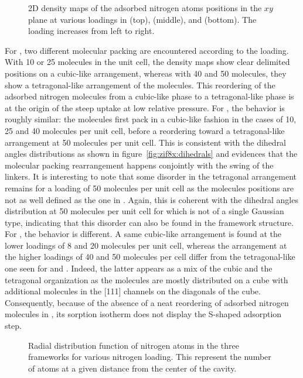 \documentclass[thesis]{subfiles}
\begin{document}
\begin{figure}[ht]
    \centering
    
    \caption{2D density maps of the adsorbed nitrogen atoms positions in the $xy$
    plane at various loadings in  (top), \ZIFCl (middle), and \ZIFBr
    (bottom). The loading increases from left to right.}
    \label{fig:zif8x:density}
\end{figure}

For , two different molecular packing are encountered according to the
loading. With 10 or 25 molecules in the unit cell, the density maps show clear
delimited positions on a cubic-like arrangement, whereas with 40 and 50
molecules, they show a tetragonal-like arrangement of the molecules. This
reordering of the adsorbed nitrogen molecules from a cubic-like phase to a
tetragonal-like phase is at the origin of the steep uptake at low relative
pressure. For \ZIFCl, the behavior is roughly similar: the molecules first pack
in a cubic-like fashion in the cases of 10, 25 and 40 molecules per unit cell,
before a reordering toward a tetragonal-like arrangement at 50 molecules per
unit cell. This is consistent with the dihedral angles distributions as shown in
figure~\ref{fig:zif8x:dihedrals} and evidences that the molecular packing
rearrangement happens conjointly with the swing of the linkers. It is
interesting to note that some disorder in the tetragonal arrangement remains for
a loading of 50 molecules per unit cell as the molecules positions are not as
well defined as the one in . Again, this is coherent with the dihedral
angles distribution at 50 molecules per unit cell for \ZIFCl which is not of a
single Gaussian type, indicating that this disorder can also be found in the
framework structure. For \ZIFBr, the behavior is different. A same cubic-like
arrangement is found at the lower loadings of 8 and 20 molecules per unit cell,
whereas the arrangement at the higher loadings of 40 and 50 molecules per cell
differ from the tetragonal-like one seen for  and \ZIFCl. Indeed, the
latter appears as a mix of the cubic and the tetragonal organization as the
molecules are mostly distributed on a cube with additional molecules in the
[111] channels on the diagonals of the cube. Consequently, because of the
absence of a neat reordering of adsorbed nitrogen molecules in \ZIFBr, its
sorption isotherm does not display the S-shaped adsorption step.

\begin{figure}[ht]
    \centering
    
    \caption{Radial distribution function of nitrogen atoms in the three
    frameworks for various nitrogen loading. This represent the number of atoms
    at a given distance from the center of the cavity.}
    \label{fig:zif8x:rdf}
\end{figure}
\end{document}
